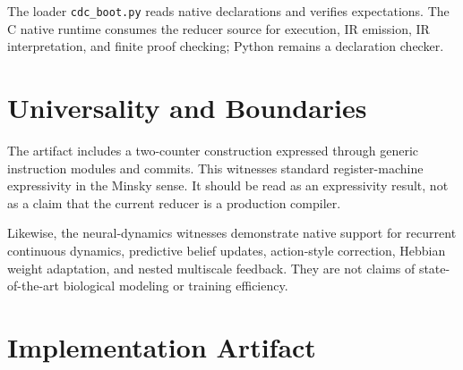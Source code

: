 \documentclass[11pt]{article}
\begin{document}
The loader \texttt{cdc\_boot.py} reads native declarations and verifies
expectations. The C native runtime consumes the reducer source for execution,
IR emission, IR interpretation, and finite proof checking; Python remains a
declaration checker.

\section{Universality and Boundaries}

The artifact includes a two-counter construction expressed through generic
instruction modules and commits. This witnesses standard register-machine
expressivity in the Minsky sense. It should be read as an expressivity result,
not as a claim that the current reducer is a production compiler.

Likewise, the neural-dynamics witnesses demonstrate native support for recurrent
continuous dynamics, predictive belief updates, action-style correction, Hebbian
weight adaptation, and nested multiscale feedback. They are not claims of
state-of-the-art biological modeling or training efficiency.

\section{Implementation Artifact}
\end{document}
